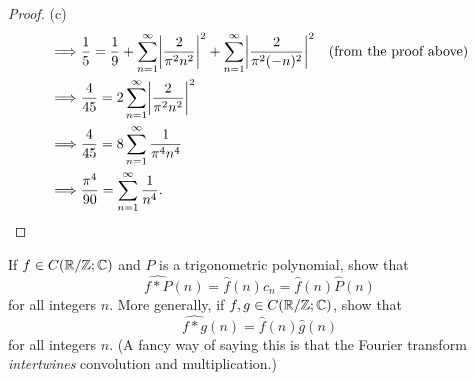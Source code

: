 \begin{proof}{(c)}
\begin{align*}
    \implies & \dfrac{1}{5} = \dfrac{1}{9} + \sum_{n = 1}^\infty \abs{\dfrac{2}{\pi^2 n^2}}^2 + \sum_{n = 1}^\infty \abs{\dfrac{2}{\pi^2 (-n)^2}}^2 &  & \text{(from the proof above)} \\
    \implies & \dfrac{4}{45} = 2 \sum_{n = 1}^\infty \abs{\dfrac{2}{\pi^2 n^2}}^2                                                                                                      \\
    \implies & \dfrac{4}{45} = 8 \sum_{n = 1}^\infty \dfrac{1}{\pi^4 n^4}                                                                                                              \\
    \implies & \dfrac{\pi^4}{90} = \sum_{n = 1}^\infty \dfrac{1}{n^4}.
  \end{align*}
\end{proof}

\begin{ex}\label{ii:ex:5.5.3}
  If \(f \in C(\mathbb{R} / \mathbb{Z} ; \mathbb{C})\) and \(P\) is a trigonometric polynomial, show that
  \[
    \widehat{f * P}(n) = \hat{f}(n) c_n = \hat{f}(n) \hat{P}(n)
  \]
  for all integers \(n\).
  More generally, if \(f, g \in C(\mathbb{R} / \mathbb{Z} ; \mathbb{C})\), show that
  \[
    \widehat{f * g}(n) = \hat{f}(n) \hat{g}(n)
  \]
  for all integers \(n\).
  (A fancy way of saying this is that the Fourier transform \emph{intertwines} convolution and multiplication.)
\end{ex}


